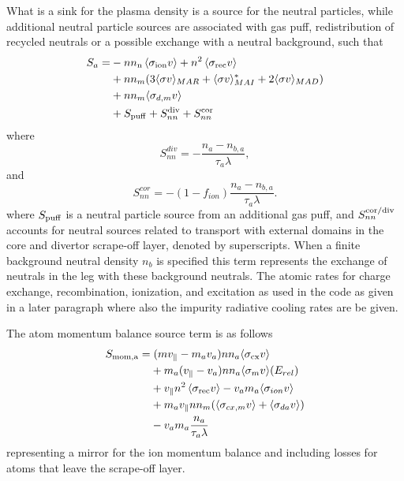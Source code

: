 \documentclass[amsmath,amssymb,a4]{revtex4-2}
\begin{document}
What is a sink for the plasma density is a source for the neutral particles, while additional neutral particle sources are associated with gas puff, redistribution of recycled neutrals or a possible exchange with a neutral background, such that
\begin{equation}\label{neutral_source}
\begin{aligned}
        S_a=&-n n_{\mathrm{n}}\left\langle\sigma_{\mathrm{ion}} v\right\rangle +n^2\left\langle\sigma_{\mathrm{rec}} v\right\rangle \\
        & + nn_m(3\langle\sigma v \rangle_{MAR} + \langle\sigma v \rangle_{MAI}^* + 2\langle\sigma v \rangle_{MAD}) \\
        &+ nn_m\langle\sigma_{d,m} v\rangle
        \\
        &+ S_{\rm puff} + S_{nn}^{\rm div} + S_{nn}^{\rm cor} 
\end{aligned}
\end{equation}
where 
\begin{equation}
    S_{nn}^{div} = - \frac{n_a-n_{b,a}}{\tau_a\lambda},
\end{equation}
and 
\begin{equation}
    S_{nn}^{cor} = - (1-f_{ion})\frac{n_a-n_{b,a}}{\tau_a\lambda}.
\end{equation}
where $S_{\rm puff}$ is a neutral particle source from an additional gas puff, and $S^{\rm cor/div}_{nn}$ accounts for neutral sources related to transport with external domains in the core and divertor scrape-off layer, denoted by superscripts. When a finite background neutral density $n_b$ is specified this term represents the exchange of neutrals in the leg with these background neutrals. The atomic rates for charge exchange, recombination, ionization, and excitation as used in the code as given in a later paragraph where also the impurity radiative cooling rates are be given.

\noindent The atom momentum balance source term is as follows
\begin{equation}
\begin{aligned}
     S_{\rm mom,a} = & \; (mv_\parallel-m_av_a)n n_a \langle\sigma_{\rm{cx}}v\rangle \\
     &+m_a(v_\parallel-v_a)nn_a\langle\sigma_m v\rangle(E_{rel}) \\
     &+v_\parallel n^2\left\langle\sigma_{\mathrm{rec}} v\right\rangle -v_am_a\langle \sigma_{ion}v\rangle  \\
     & +  m_a v_\parallel nn_m(\langle\sigma_{cx,m} v \rangle + \langle\sigma_{da} v \rangle) \\
     &-v_am_a\frac{n_a}{\tau_a\lambda} \\
\end{aligned}
\label{eq:S_mom,a}
\end{equation}
representing a mirror for the ion momentum balance and including losses for atoms that leave the scrape-off layer.
\noindent 
\end{document}
